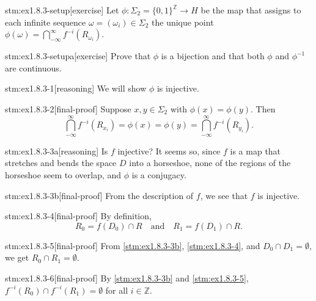 
\begin{stm}{stm:ex1.8.3-setup}[exercise]
Let $\phi : \Sigma_2 = \{0,1\}^{\mathbb{Z}} \to H$ be the map that assigns to each infinite sequence $\omega = (\omega_i) \in \Sigma_2$ the unique point $\phi(\omega) = \bigcap_{-\infty}^\infty f^{-i}(R_{\omega_i})$.
\end{stm}

\begin{stm}{stm:ex1.8.3-setupa}[exercise]
Prove that $\phi$ is a bijection and that both $\phi$ and $\phi^{-1}$ are continuous.
\end{stm}


\begin{stm}{stm:ex1.8.3-1}[reasoning]
We will show $\phi$ is injective.
\end{stm}

\begin{stm}{stm:ex1.8.3-2}[final-proof]
Suppose $x, y \in \Sigma_2$ with $\phi(x) = \phi(y)$. Then 
\[
\bigcap_{-\infty}^\infty f^{-i}(R_{x_i}) = \phi(x) = \phi(y) = \bigcap_{-\infty}^\infty f^{-i}(R_{y_i}).
\]
\end{stm}

\begin{stm}{stm:ex1.8.3-3a}[reasoning]
Is $f$ injective? It seems so, since $f$ is a map that stretches and bends the space $D$ into a horseshoe, none of the regions of the horseshoe seem to overlap, and $\phi$ is a conjugacy.
\end{stm}

\begin{stm}{stm:ex1.8.3-3b}[final-proof]
From the description of $f$, we see that $f$ is injective.
\end{stm}

\begin{stm}{stm:ex1.8.3-4}[final-proof]
By definition,
\[
R_0 = f(D_0) \cap R \quad \text{and} \quad R_1 = f(D_1) \cap R.
\]
\end{stm}

\begin{stm}{stm:ex1.8.3-5}[final-proof]
From \ref{stm:ex1.8.3-3b}, \ref{stm:ex1.8.3-4}, and $D_0 \cap D_1 = \emptyset$, we get $R_0 \cap R_1 = \emptyset$.
\end{stm}

\begin{stm}{stm:ex1.8.3-6}[final-proof]
By \ref{stm:ex1.8.3-3b} and \ref{stm:ex1.8.3-5}, $f^{-i}(R_0) \cap f^{-i}(R_1) = \emptyset$ for all $i \in \mathbb{Z}$.
\end{stm}

